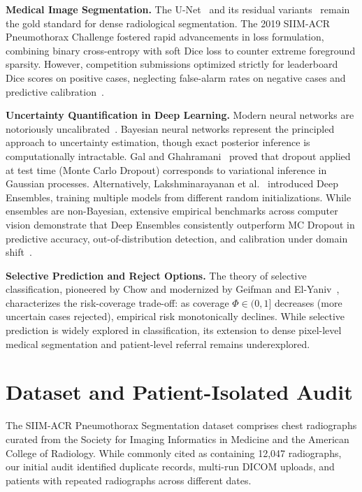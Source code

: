 \documentclass[11pt,a4paper]{article}
\begin{document}
\textbf{Medical Image Segmentation.} The U-Net~\cite{ronneberger2015u} and its residual variants~\cite{he2016deep} remain the gold standard for dense radiological segmentation. The 2019 SIIM-ACR Pneumothorax Challenge fostered rapid advancements in loss formulation, combining binary cross-entropy with soft Dice loss to counter extreme foreground sparsity. However, competition submissions optimized strictly for leaderboard Dice scores on positive cases, neglecting false-alarm rates on negative cases and predictive calibration~\cite{siim2019pneumothorax}.

\textbf{Uncertainty Quantification in Deep Learning.} Modern neural networks are notoriously uncalibrated~\cite{guo2017calibration}. Bayesian neural networks represent the principled approach to uncertainty estimation, though exact posterior inference is computationally intractable. Gal and Ghahramani~\cite{gal2016dropout} proved that dropout applied at test time (Monte Carlo Dropout) corresponds to variational inference in Gaussian processes. Alternatively, Lakshminarayanan et al.~\cite{lakshminarayanan2017simple} introduced Deep Ensembles, training multiple models from different random initializations. While ensembles are non-Bayesian, extensive empirical benchmarks across computer vision demonstrate that Deep Ensembles consistently outperform MC Dropout in predictive accuracy, out-of-distribution detection, and calibration under domain shift~\cite{ovadia2019can, filos2020systematic}.

\textbf{Selective Prediction and Reject Options.} The theory of selective classification, pioneered by Chow and modernized by Geifman and El-Yaniv~\cite{geifman2017selective, geifman2019selectivenet}, characterizes the risk-coverage trade-off: as coverage $\Phi \in (0, 1]$ decreases (more uncertain cases rejected), empirical risk monotonically declines. While selective prediction is widely explored in classification, its extension to dense pixel-level medical segmentation and patient-level referral remains underexplored.

\section{Dataset and Patient-Isolated Audit}
\label{sec:dataset}

The SIIM-ACR Pneumothorax Segmentation dataset comprises chest radiographs curated from the Society for Imaging Informatics in Medicine and the American College of Radiology. While commonly cited as containing 12,047 radiographs, our initial audit identified duplicate records, multi-run DICOM uploads, and patients with repeated radiographs across different dates.
\end{document}
